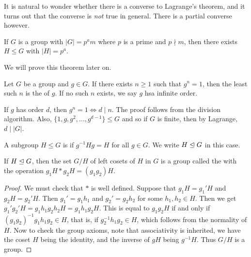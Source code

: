 \documentclass[a4paper]{scrreprt}
\begin{document}
It is natural to wonder whether there is a converse to Lagrange's theorem, and it turns out that the converse is \emph{not} true in general. There is a partial converse however.

\begin{theorem}
	If $G$ is a group with $|G| = p^a m$ where $p$ is a prime and $p \nmid m$, then there exists $H \leq G$ with $|H| = p^a$.
\end{theorem}

We will prove this theorem later on.

\begin{definition}
	Let $G$ be a group and $g \in G$. If there exists $n \geq 1$ such that $g^n = 1$, then the least such $n$ is the  of $g$. If no such $n$ exists, we say $g$ hsa infinite order.
\end{definition}

\begin{remark} 
If $g$ has order $d$, then $g^n = 1 \iff d \mid n$. The proof follows from the division algorithm. Also, $\{1, g, g^2, \dots, g^{d - 1}\} \leq G$ and so if $G$ is finite, then by Lagrange, $d \mid |G|$.
\end{remark}

\begin{definition}
	A subgroup $H \leq G$ is  if $g^{-1} H g = H$ for all $g \in G$. We write $H \trianglelefteq G$ in this case.
\end{definition}

\begin{proposition}
	If $H \trianglelefteq G$, then the set $G/H$ of left cosets of $H$ in $G$ is a group called the  with the operation $g_1 H * g_2 H = (g_1 g_2) H$.
\end{proposition}
\begin{proof}
	We must check that $*$ is well defined. Suppose that $g_1H = g_1' H$ and $g_2H = g_2' H$. Then $g_1' = g_1 h_1$ and $g_2' = g_2 h_2$ for some $h_1, h_2 \in H$. Then we get $g_1' g_2' H = g_1 h_1 g_2 h_2 H = g_1 h_1 g_2 H$. This is equal to $g_1 g_2 H$ if and only if $(g_1 g_2)^{-1} g_1 h_1 g_2 \in H$, that is, if $g_2^{-1} h_1 g_2 \in H$, which follows from the normality of $H$. Now to check the group axioms, note that associativity is inherited, we have the coset $H$ being the identity, and the inverse of $gH$ being $g^{-1} H$. Thus $G/H$ is a group.
\end{proof}
\end{document}
